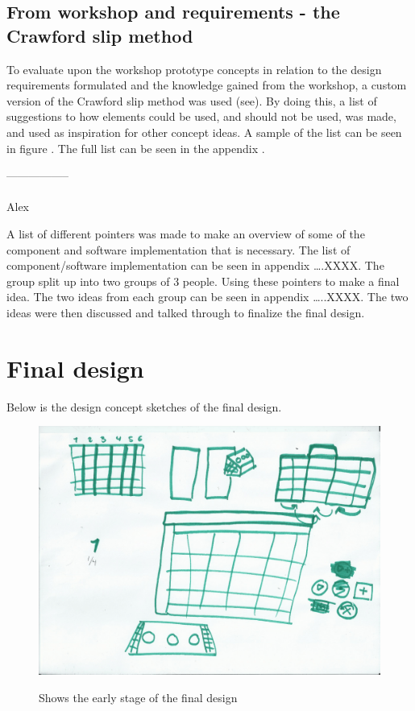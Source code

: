 \subsection{From workshop and requirements - the Crawford slip method}
To evaluate upon the workshop prototype concepts in relation to the design requirements formulated and the knowledge gained from the workshop, a custom version of the Crawford slip method was used (see). By doing this, a list of suggestions to how elements could be used, and should not be used, was made, and used as inspiration for other concept ideas. A sample of the list can be seen in figure . The full list can be seen in the appendix .  

-----------------\\\\







Alex


A list of different pointers was made to make an overview of some of the component and software implementation that is necessary. 
The list of component/software implementation can be seen in appendix ….XXXX. 
The group split up into two groups of 3 people. Using these pointers to make a final idea. 
The two ideas from each group can be seen in appendix …..XXXX. 
The two ideas were then discussed and talked through to finalize the final design. 

\section{Final design}
Below is the design concept sketches of the final design. 

\begin{figure}[H]
	\centering
	\includegraphics[width=0.7\linewidth]{figure/Design/sketchOne}
	\label{fig:sketchOne}
	\caption{Shows the early stage of the final design}
	
\end{figure}

